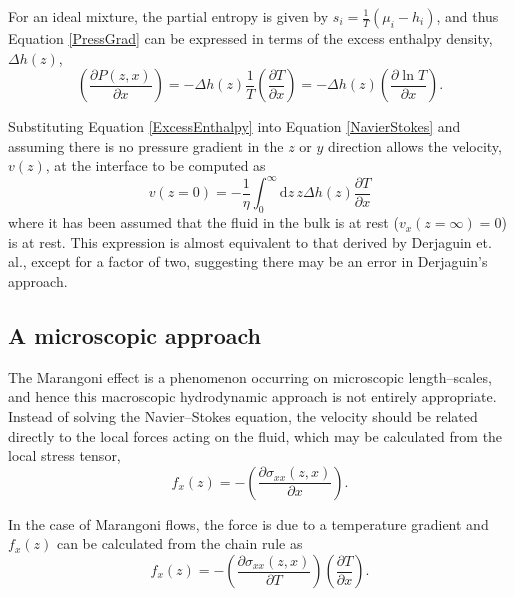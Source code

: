 For an ideal mixture, the partial entropy is given by $s_{i}=\frac{1}{T} \left(\mu_{i}-h_{i} \right)$, and thus Equation \ref{PressGrad} can be expressed in terms of the excess enthalpy density, $\Delta h(z)$,
\begin{equation}
\label{ExcessEnthalpy}
\left(\frac{\partial P(z,x)}{\partial x}\right)= - \Delta h(z)\frac{1}{T} \left( \frac{\partial T}{\partial x} \right) 
= - \Delta h(z) \left( \frac{\partial \ln T}{\partial x} \right).
\end{equation}

Substituting Equation \ref{ExcessEnthalpy} into Equation \ref{NavierStokes} and assuming there is no pressure gradient in the $z$ or $y$ direction allows the velocity, $v(z)$, at the interface to be computed as
\begin{equation}
\label{DoubleIntegral}
v (z=0) = - \frac{1}{\eta}\int_{0}^{\infty} \mathrm{d}z\, z \Delta h(z) \frac{\partial T}{\partial x}
\end{equation}
where it has been assumed that the fluid in the bulk is at rest ($v_{x}(z=\infty)=0$) is at rest.
This expression is almost equivalent to that derived by Derjaguin et. al., except for a factor of two, suggesting there may be an error in Derjaguin's approach.\cite{SurfaceForces, Anderson}

\subsection{A microscopic approach}
The Marangoni effect is a phenomenon occurring on microscopic length--scales, and hence this macroscopic hydrodynamic approach is not entirely appropriate.
Instead of solving the Navier--Stokes equation, the velocity should be related directly to the local forces acting on the fluid, which may be calculated from the local stress tensor,
\begin{equation}
\label{ForceStress}
f_{x}(z) = - \left( \frac{\partial \sigma_{xx}(z,x)}{\partial x} \right).
\end{equation}

In the case of Marangoni flows, the force is due to a temperature gradient and $f_{x}(z)$ can be calculated from the chain rule as
\begin{equation}
\label{ForceStressTemp}
f_{x}(z) = - \left( \frac{\partial \sigma_{xx}(z,x)}{\partial T} \right) \left( \frac{\partial T}{\partial x} \right).
\end{equation}

